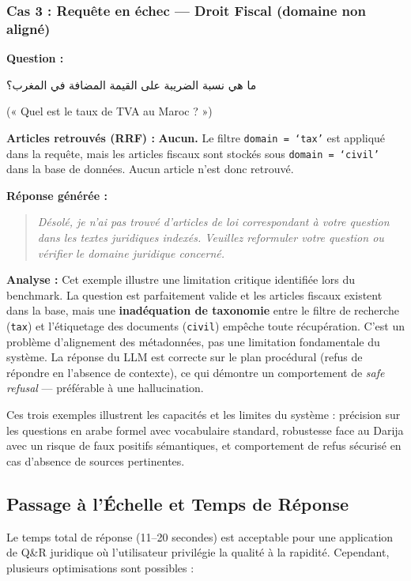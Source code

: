 \subsubsection{Cas 3 : Requête en échec — Droit Fiscal (domaine non aligné)}

\textbf{Question :}\par
\begin{flushleft}\textarabic{ما هي نسبة الضريبة على القيمة المضافة في المغرب؟}\end{flushleft}
(« Quel est le taux de TVA au Maroc ? »)

\textbf{Articles retrouvés (RRF) :} \textbf{Aucun.}
Le filtre \texttt{domain = `tax'} est appliqué dans la requête, mais les
articles fiscaux sont stockés sous \texttt{domain = `civil'} dans la base
de données. Aucun article n'est donc retrouvé.

\textbf{Réponse générée :}
\begin{quote}
\textit{Désolé, je n'ai pas trouvé d'articles de loi correspondant à votre
question dans les textes juridiques indexés. Veuillez reformuler votre
question ou vérifier le domaine juridique concerné.}
\end{quote}

\textbf{Analyse :} Cet exemple illustre une limitation critique identifiée
lors du benchmark. La question est parfaitement valide et les articles
fiscaux existent dans la base, mais une \textbf{inadéquation de taxonomie}
entre le filtre de recherche (\texttt{tax}) et l'étiquetage des documents
(\texttt{civil}) empêche toute récupération. C'est un problème
d'alignement des métadonnées, pas une limitation fondamentale du système.
La réponse du LLM est correcte sur le plan procédural (refus de répondre
en l'absence de contexte), ce qui démontre un comportement de \textit{safe
refusal} — préférable à une hallucination.

Ces trois exemples illustrent les capacités et les limites du système :
précision sur les questions en arabe formel avec vocabulaire standard,
robustesse face au Darija avec un risque de faux positifs sémantiques, et
comportement de refus sécurisé en cas d'absence de sources pertinentes.

\subsection{Passage à l'Échelle et Temps de Réponse}

Le temps total de réponse (11--20 secondes) est acceptable pour une
application de Q\&R juridique où l'utilisateur privilégie la qualité à la
rapidité. Cependant, plusieurs optimisations sont possibles :

